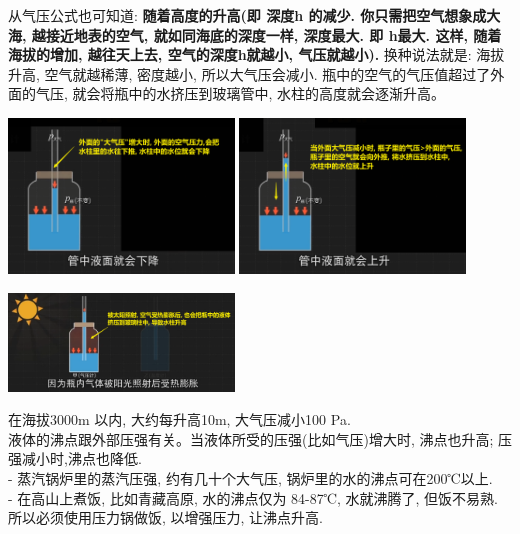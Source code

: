 \documentclass[UTF8]{ctexart}
\begin{document}
	从气压公式也可知道: \textbf{随着高度的升高(即 深度h 的减少. 你只需把空气想象成大海, 越接近地表的空气, 就如同海底的深度一样, 深度最大. 即 h最大. 这样, 随着海拔的增加, 越往天上去, 空气的深度h就越小, 气压就越小).}  换种说法就是: 海拔升高, 空气就越稀薄, 密度越小, 所以大气压会减小. 瓶中的空气的气压值超过了外面的气压, 就会将瓶中的水挤压到玻璃管中,  水柱的高度就会逐渐升高。
	
	\includegraphics[width=0.45\textwidth]{img/0032.png} 
	\includegraphics[width=0.45\textwidth]{img/0033.png} 
	
	\includegraphics[width=0.45\textwidth]{img/0036.png} 	
	
	在海拔3000m 以内, 大约每升高10m, 大气压减小100 Pa. \\
	
	液体的沸点跟外部压强有关。当液体所受的压强(比如气压)增大时, 沸点也升高; 压强减小时,沸点也降低.   \\	
	- 蒸汽锅炉里的蒸汽压强, 约有几十个大气压, 锅炉里的水的沸点可在200℃以上. \\	
	- 在高山上煮饭, 比如青藏高原, 水的沸点仅为 84-87℃, 水就沸腾了, 但饭不易熟. 所以必须使用压力锅做饭, 以增强压力, 让沸点升高.
	
	
	
	
	
	
	
	\vspace{1em} 
	
\end{document}
